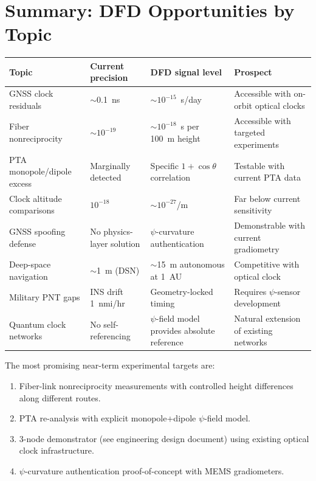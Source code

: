 \documentclass[12pt,letterpaper]{article}
\begin{document}
\section{Summary: DFD Opportunities by Topic}

\begin{longtable}{@{}p{4cm}p{3cm}p{3cm}p{3.5cm}@{}}
\toprule
Topic & Current precision & DFD signal level & Prospect \\
\midrule
\endhead
GNSS clock residuals & $\sim$0.1~ns & $\sim 10^{-15}$~s/day & Accessible
with on-orbit optical clocks \\
Fiber nonreciprocity & $\sim 10^{-19}$ & $\sim 10^{-18}$~s per 100~m
height & Accessible with targeted experiments \\
PTA monopole/dipole excess & Marginally detected & Specific
$1+\cos\theta$ correlation & Testable with current PTA data \\
Clock altitude comparisons & $10^{-18}$ & $\sim 10^{-27}$/m & Far below
current sensitivity \\
GNSS spoofing defense & No physics-layer solution & $\psi$-curvature
authentication & Demonstrable with current gradiometry \\
Deep-space navigation & $\sim$1~m (DSN) & $\sim$15~m autonomous at 1~AU
& Competitive with optical clock \\
Military PNT gaps & INS drift 1~nmi/hr & Geometry-locked timing & Requires
$\psi$-sensor development \\
Quantum clock networks & No self-referencing & $\psi$-field model provides
absolute reference & Natural extension of existing networks \\
\bottomrule
\end{longtable}

The most promising near-term experimental targets are:
\begin{enumerate}
\item Fiber-link nonreciprocity measurements with controlled height
differences along different routes.
\item PTA re-analysis with explicit monopole+dipole $\psi$-field model.
\item 3-node demonstrator (see engineering design document) using
existing optical clock infrastructure.
\item $\psi$-curvature authentication proof-of-concept with MEMS
gradiometers.
\end{enumerate}
\end{document}

